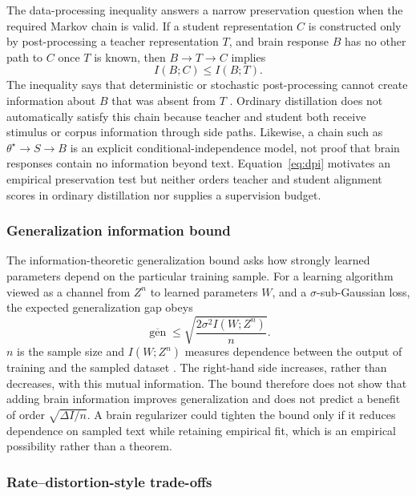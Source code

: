 The data-processing inequality answers a narrow preservation question when the required Markov chain is valid.
If a student representation $C$ is constructed only by post-processing a teacher representation $T$, and brain response $B$ has no other path to $C$ once $T$ is known, then $B\rightarrow T\rightarrow C$ implies
\begin{equation}
  I(B;C)\leq I(B;T).
  \label{eq:dpi}
\end{equation}
The inequality says that deterministic or stochastic post-processing cannot create information about $B$ that was absent from $T$ \autocite{cover2006}.
Ordinary distillation does not automatically satisfy this chain because teacher and student both receive stimulus or corpus information through side paths.
Likewise, a chain such as $\theta^\star\rightarrow S\rightarrow B$ is an explicit conditional-independence model, not proof that brain responses contain no information beyond text.
Equation~\ref{eq:dpi} motivates an empirical preservation test but neither orders teacher and student alignment scores in ordinary distillation nor supplies a supervision budget.

\subsubsection{Generalization information bound}

The information-theoretic generalization bound asks how strongly learned parameters depend on the particular training sample.
For a learning algorithm viewed as a channel from $Z^n$ to learned parameters $W$, and a $\sigma$-sub-Gaussian loss, the expected generalization gap obeys
\begin{equation}
  \overline{\operatorname{gen}}\leq\sqrt{\frac{2\sigma^2 I(W;Z^n)}{n}} .
  \label{eq:mi-generalization}
\end{equation}
$n$ is the sample size and $I(W;Z^n)$ measures dependence between the output of training and the sampled dataset \autocite{xu2017}.
The right-hand side increases, rather than decreases, with this mutual information.
The bound therefore does not show that adding brain information improves generalization and does not predict a benefit of order $\sqrt{\Delta I/n}$.
A brain regularizer could tighten the bound only if it reduces dependence on sampled text while retaining empirical fit, which is an empirical possibility rather than a theorem.

\subsubsection{Rate--distortion-style trade-offs}

